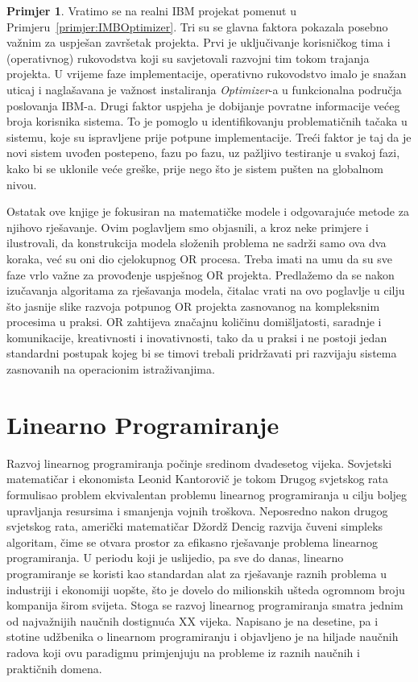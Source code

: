 \documentclass[a4paper, utf8, 11pt, colorlinks]{book}
\theoremstyle{definition}
\newtheorem{primjer}{Primjer}[chapter]
\begin{document}
\begin{primjer} Vratimo se na realni  IBM projekat pomenut u Primjeru~\ref{primjer:IMBOptimizer}.  Tri su se glavna faktora pokazala posebno važnim za uspješan završetak projekta. Prvi je   uključivanje korisničkog tima i (operativnog) rukovodstva koji su savjetovali razvojni tim tokom trajanja   projekta. U vrijeme faze implementacije, operativno rukovodstvo imalo je snažan  uticaj i naglašavana je važnost instaliranja \emph{Optimizer}-a u  funkcionalna područja poslovanja IBM-a. Drugi faktor uspjeha je dobijanje povratne informacije  većeg broja korisnika sistema. To je pomoglo u identifikovanju problematičnih tačaka u sistemu, koje su ispravljene prije potpune implementacije. 
Treći faktor je taj da je novi sistem  uvođen postepeno, fazu po fazu, uz pažljivo testiranje u svakoj fazi, kako bi se uklonile veće greške, prije nego što  je sistem   pušten na  globalnom nivou.  
\end{primjer}
\vspace{0.5cm}

Ostatak ove knjige je fokusiran na  matematičke modele i odgovarajuće metode za njihovo rješavanje. Ovim poglavljem smo objasnili, a kroz neke primjere i ilustrovali, da konstrukcija modela složenih problema ne sadrži samo ova dva koraka, već su oni  dio cjelokupnog OR procesa. Treba imati na umu da su sve faze vrlo važne za provođenje uspješnog OR projekta. Predlažemo da se nakon izučavanja algoritama za rješavanja modela, čitalac vrati na ovo poglavlje u cilju što jasnije slike razvoja potpunog OR projekta zasnovanog na kompleksnim procesima u praksi.  OR zahtijeva značajnu količinu domišljatosti, saradnje i komunikacije, kreativnosti i inovativnosti, tako da u praksi i ne postoji jedan standardni postupak kojeg bi se timovi trebali pridržavati pri razvijaju sistema zasnovanih na operacionim istraživanjima. %

\chapter{Linearno Programiranje} \label{chp:lp}
  
  Razvoj linearnog programiranja počinje sredinom dvadesetog vijeka. Sovjetski matematičar i ekonomista Leonid Kantorovič je tokom Drugog svjetskog rata formulisao problem ekvivalentan problemu linearnog programiranja u cilju boljeg upravljanja resursima i smanjenja vojnih troškova. Neposredno nakon drugog svjetskog rata, američki matematičar Džordž Dencig razvija čuveni simpleks algoritam, čime se otvara prostor za efikasno rješavanje problema linearnog programiranja. U periodu koji je uslijedio, pa sve do danas, linearno programiranje se koristi kao standardan alat za rješavanje raznih problema u industriji i ekonomiji uopšte, što je dovelo do   milionskih ušteda ogromnom broju kompanija širom svijeta. Stoga se 
razvoj linearnog programiranja  smatra jednim od najvažnijih naučnih dostignu\-ća XX vijeka.  Napisano je na desetine, pa i stotine udžbenika
o linearnom programiranju i objavljeno je na hiljade naučnih radova koji   ovu paradigmu primjenjuju na probleme iz raznih naučnih i praktičnih domena. 
\end{document}
